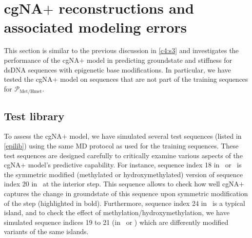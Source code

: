 \section{cgNA$+$ reconstructions and associated modeling errors}\label{c6:s2}
This section is similar to the previous discussion in \cref{c4:s3} and investigates the performance of the cgNA$+$ model in predicting groundstate and stiffness for dsDNA sequences with epigenetic base modifications.
In particular, we have tested the cgNA$+$ model on sequences that are not part of the training sequences for $\mathcal{P}_{\text{Met/Hmet}}$. 

\subsection{Test library}
To assess the cgNA$+$ model, we have simulated several test sequences (listed in \cref{epilib}) using the same MD protocol as used for the training sequences.
These test sequences are designed carefully to critically examine various aspects of the cgNA$+$ model's predictive capability. 
For instance, sequence index 18 in \Lbm \ or \Lbh \ is the symmetric modified (methylated or hydroxymethylated) version of sequence index 20 in \Lbdna \ at the interior \cpg step.
This sequence allows to check how well cgNA$+$ captures the change in groundstate of this sequence  upon symmetric modification of the \cpg step (highlighted in bold).
Furthermore, sequence index 24 in \Lbdna \ is a typical \cpg island, and to check the effect of \cpg methylation/hydroxymethylation, we have simulated sequence indices 19 to 21 (in \Lbh \ or \Lbm) which are differently modified variants of the same \cpg islands.

